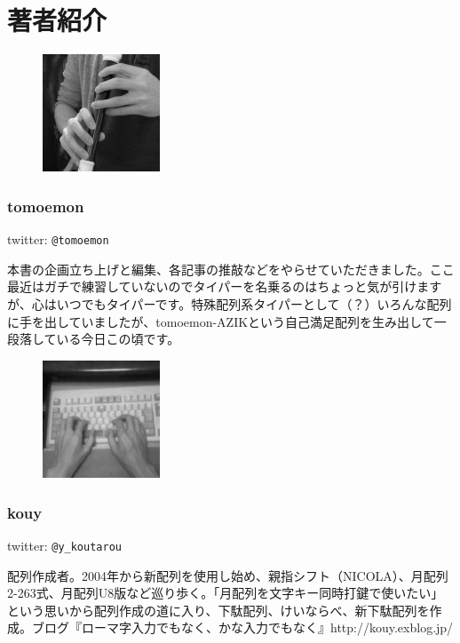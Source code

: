 
\vspace{10mm}

\part*{著者紹介}

\begin{figure}
\includegraphics[width=3.5cm,clip]{res_author/tomoemon_temoto.eps}
\end{figure}
\section*{tomoemon}
twitter: \verb|@tomoemon|

本書の企画立ち上げと編集、各記事の推敲などをやらせていただきました。ここ最近はガチで練習していないのでタイパーを名乗るのはちょっと気が引けますが、心はいつでもタイパーです。特殊配列系タイパーとして（？）いろんな配列に手を出していましたが、tomoemon-AZIKという自己満足配列を生み出して一段落している今日この頃です。

\vspace{5mm}

\begin{figure}
\includegraphics[width=3.5cm,clip]{res_author/kouy_temoto.eps}
\end{figure}
\section*{kouy}
twitter: \verb|@y_koutarou|

配列作成者。2004年から新配列を使用し始め、親指シフト（NICOLA）、月配列2-263式、月配列U8版など巡り歩く。「月配列を文字キー同時打鍵で使いたい」という思いから配列作成の道に入り、下駄配列、けいならべ、新下駄配列を作成。ブログ『ローマ字入力でもなく、かな入力でもなく』http://kouy.exblog.jp/

